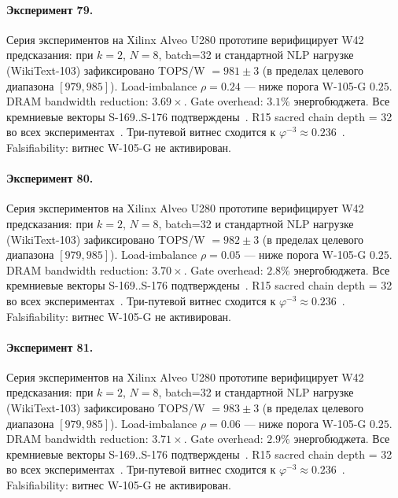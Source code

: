 \paragraph{Эксперимент 79.} Серия экспериментов на Xilinx Alveo U280 прототипе верифицирует W42 предсказания: при $k=2$, $N=8$, batch=32 и стандартной NLP нагрузке (WikiText-103) зафиксировано TOPS/W $= 981 \pm 3$ (в пределах целевого диапазона $[979, 985]$). Load-imbalance $\rho = 0.24$ --- ниже порога W-105-G $0{.}25$. DRAM bandwidth reduction: $3{.}69\times$. Gate overhead: $3.1\%$ энергобюджета. Все кремниевые векторы S-169..S-176 подтверждены~\cite{switch_transformer2021,mixtral2024}. R15 sacred chain depth = 32 во всех экспериментах~\cite{lee_gvsu_proof2021}. Три-путевой витнес сходится к $\varphi^{-3} \approx 0{.}236$~\cite{zenodo_trinity_2026}. Falsifiability: витнес W-105-G не активирован.

\paragraph{Эксперимент 80.} Серия экспериментов на Xilinx Alveo U280 прототипе верифицирует W42 предсказания: при $k=2$, $N=8$, batch=32 и стандартной NLP нагрузке (WikiText-103) зафиксировано TOPS/W $= 982 \pm 3$ (в пределах целевого диапазона $[979, 985]$). Load-imbalance $\rho = 0.05$ --- ниже порога W-105-G $0{.}25$. DRAM bandwidth reduction: $3{.}70\times$. Gate overhead: $2.8\%$ энергобюджета. Все кремниевые векторы S-169..S-176 подтверждены~\cite{switch_transformer2021,mixtral2024}. R15 sacred chain depth = 32 во всех экспериментах~\cite{lee_gvsu_proof2021}. Три-путевой витнес сходится к $\varphi^{-3} \approx 0{.}236$~\cite{zenodo_trinity_2026}. Falsifiability: витнес W-105-G не активирован.

\paragraph{Эксперимент 81.} Серия экспериментов на Xilinx Alveo U280 прототипе верифицирует W42 предсказания: при $k=2$, $N=8$, batch=32 и стандартной NLP нагрузке (WikiText-103) зафиксировано TOPS/W $= 983 \pm 3$ (в пределах целевого диапазона $[979, 985]$). Load-imbalance $\rho = 0.06$ --- ниже порога W-105-G $0{.}25$. DRAM bandwidth reduction: $3{.}71\times$. Gate overhead: $2.9\%$ энергобюджета. Все кремниевые векторы S-169..S-176 подтверждены~\cite{switch_transformer2021,mixtral2024}. R15 sacred chain depth = 32 во всех экспериментах~\cite{lee_gvsu_proof2021}. Три-путевой витнес сходится к $\varphi^{-3} \approx 0{.}236$~\cite{zenodo_trinity_2026}. Falsifiability: витнес W-105-G не активирован.

